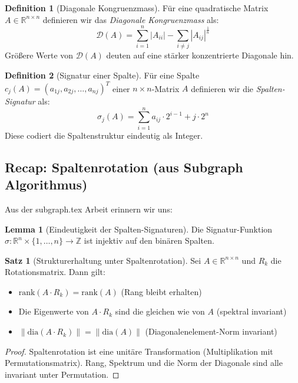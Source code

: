 \documentclass[a4paper,12pt]{article}
\theoremstyle{definition}
\newtheorem{definition}{Definition}
\newtheorem{satz}{Satz}
\newtheorem{lemma}{Lemma}
\begin{document}
\begin{definition}[Diagonale Kongruenzmass]
	Für eine quadratische Matrix $A \in \mathbb{R}^{n \times n}$ definieren wir das \emph{Diagonale Kongruenzmass} als:
	\[
	\mathcal{D}(A) = \sum_{i=1}^{n} |A_{ii}| - \sum_{i \neq j} |A_{ij}|^{\frac{1}{n}}
	\]
	Größere Werte von $\mathcal{D}(A)$ deuten auf eine stärker konzentrierte Diagonale hin.
\end{definition}

\begin{definition}[Signatur einer Spalte]
	Für eine Spalte $c_j(A) = (a_{1j}, a_{2j}, \ldots, a_{nj})^T$ einer $n \times n$-Matrix $A$ definieren wir die \emph{Spalten-Signatur} als:
	\[
	\sigma_j(A) = \sum_{i=1}^{n} a_{ij} \cdot 2^{i-1} + j \cdot 2^n
	\]
	Diese codiert die Spaltenstruktur eindeutig als Integer.
\end{definition}

\subsection{Recap: Spaltenrotation (aus Subgraph Algorithmus)}

Aus der subgraph.tex Arbeit erinnern wir uns:

\begin{lemma}[Eindeutigkeit der Spalten-Signaturen]
	Die Signatur-Funktion $\sigma: \mathbb{R}^n \times \{1,\ldots,n\} \to \mathbb{Z}$ ist injektiv auf den binären Spalten.
\end{lemma}

\begin{satz}[Strukturerhaltung unter Spaltenrotation]
	Sei $A \in \mathbb{R}^{n \times n}$ und $R_k$ die Rotationsmatrix. Dann gilt:
	\begin{itemize}
		\item $\text{rank}(A \cdot R_k) = \text{rank}(A)$ (Rang bleibt erhalten)
		\item Die Eigenwerte von $A \cdot R_k$ sind die gleichen wie von $A$ (spektral invariant)
		\item $\|\text{dia}(A \cdot R_k)\| = \|\text{dia}(A)\|$ (Diagonalenelement-Norm invariant)
	\end{itemize}
\end{satz}

\begin{proof}
	Spaltenrotation ist eine unitäre Transformation (Multiplikation mit Permutationsmatrix). Rang, Spektrum und die Norm der Diagonale sind alle invariant unter Permutation.
\end{proof}
\end{document}
